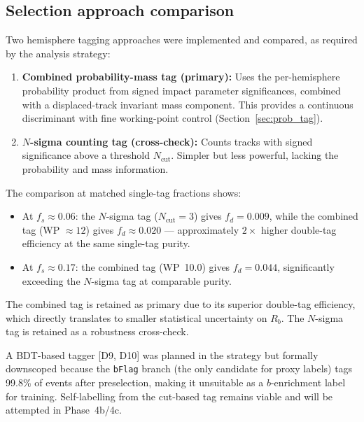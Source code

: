 \documentclass[11pt,a4paper]{article}
\begin{document}
\subsection{Selection approach comparison}
\label{sec:selection_comparison}

Two hemisphere tagging approaches were implemented and compared, as required by the
analysis strategy:

\begin{enumerate}
\item \textbf{Combined probability-mass tag (primary):} Uses the per-hemisphere probability
product from signed impact parameter significances, combined with a displaced-track
invariant mass component. This provides a continuous discriminant with fine working-point
control (Section~\ref{sec:prob_tag}).

\item \textbf{$N$-sigma counting tag (cross-check):} Counts tracks with signed significance
above a threshold $N_\mathrm{cut}$. Simpler but less powerful, lacking the probability
and mass information.
\end{enumerate}

The comparison at matched single-tag fractions shows:
\begin{itemize}
\item At $f_s \approx 0.06$: the $N$-sigma tag ($N_\mathrm{cut} = 3$) gives $f_d = 0.009$,
while the combined tag (WP $\approx 12$) gives $f_d \approx 0.020$ --- approximately
$2\times$ higher double-tag efficiency at the same single-tag purity.
\item At $f_s \approx 0.17$: the combined tag (WP~10.0) gives $f_d = 0.044$, significantly
exceeding the $N$-sigma tag at comparable purity.
\end{itemize}

The combined tag is retained as primary due to its superior double-tag efficiency, which
directly translates to smaller statistical uncertainty on $R_b$. The $N$-sigma tag is
retained as a robustness cross-check.

A BDT-based tagger [D9, D10] was planned in the strategy but formally downscoped
because the \texttt{bFlag} branch (the only candidate for proxy labels) tags 99.8\%
of events after preselection, making it unsuitable as a $b$-enrichment label for training.
Self-labelling from the cut-based tag remains viable and will be attempted in Phase~4b/4c.

\FloatBarrier
{}
\end{document}
